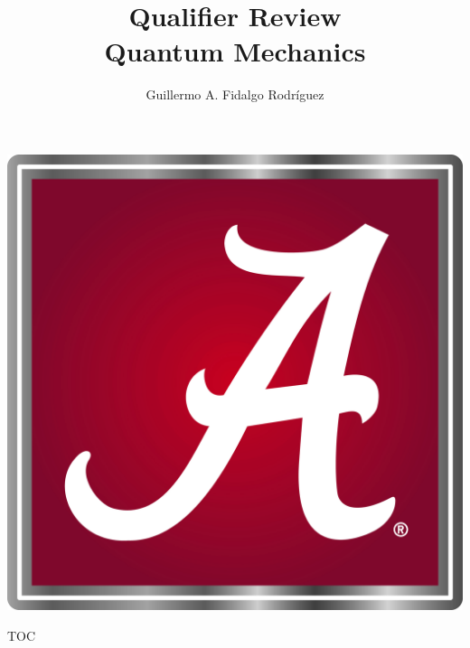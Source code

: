 \documentclass[aspectratio=1610,compress]{beamer}
\title[Qual Review]{Qualifier Review\\ Quantum Mechanics}
\date{\thedate}
\author[G. Fidalgo]{Guillermo A. Fidalgo Rodríguez}
\institute[UA]{University of Alabama}
\begin{document}
\begin{frame}
	\titlepage
	\hfill
	\includegraphics[width=.5in]{Images/UA_logo.jpg}
\end{frame}

\begin{frame}{TOC}
	\begin{multicols}{2}
		\tableofcontents[sectionstyle=show,subsectionstyle=hide]
	\end{multicols}
\end{frame}




% 
% 
% 


\end{document}
